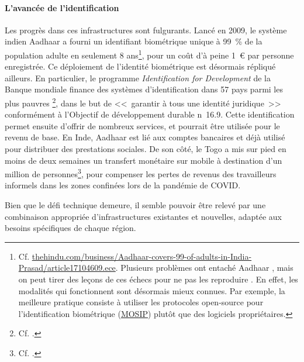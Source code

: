 \documentclass[a5paper,french,openany]{memoir}
\begin{document}
\paragraph{L'avancée de l'identification}
Les progrès dans ces infrastructures sont fulgurants. Lancé en 2009, le système indien Aadhaar a fourni un identifiant biométrique unique à 99~\% de la population adulte en seulement 8 ans\footnote{Cf. \href{https://www.thehindu.com/business/Aadhaar-covers-99-of-adults-in-India-Prasad/article17104609.ece}{thehindu.com/business/Aadhaar-covers-99-of-adults-in-India-Prasad/article17104609.ece}. Plusieurs problèmes ont entaché Aadhaar \citep{dreze_aadhaar_2017}, mais on peut tirer des leçons de ces échecs pour ne pas les reproduire \citep{gelb_digital_2019,muralidharan_identity_2023}. En effet, les modalités qui fonctionnent sont désormais mieux connues. Par exemple, la meilleure pratique consiste à utiliser les protocoles open-source pour l'identification biométrique (\href{https://mosip.io/}{MOSIP}) plutôt que des logiciels propriétaires.}, pour un coût d'à peine 1~\euro{} par personne enregistrée. Ce déploiement de l'identité biométrique est désormais répliqué ailleurs. %
En particulier, le programme \textit{Identification for Development} de la Banque mondiale finance des systèmes d'identification dans 57 pays parmi les plus pauvres 
\footnote{Cf. \cite{world_bank_state_2017,world_bank_benin_2020,world_bank_identification_2022}.}, dans le but de <<~garantir à tous une identité juridique~>> conformément à l'Objectif de développement durable n\textdegree{}~16.9. Cette identification permet ensuite d'offrir de nombreux services, et pourrait être utilisée pour le revenu de base. En Inde, Aadhaar est lié aux comptes bancaires et déjà utilisé pour distribuer des prestations sociales. De son côté, le Togo a mis sur pied en moins de deux semaines un transfert monétaire sur mobile à destination d'un million de personnes\footnote{Cf. \cite{ipa_togos_2021}.}, pour compenser les pertes de revenus des travailleurs informels dans les zones confinées lors de la pandémie de COVID. 

Bien que le défi technique demeure, il semble pouvoir être relevé par une combinaison appropriée d'infrastructures existantes et nouvelles, adaptée aux besoins spécifiques de chaque région. 
\end{document}

